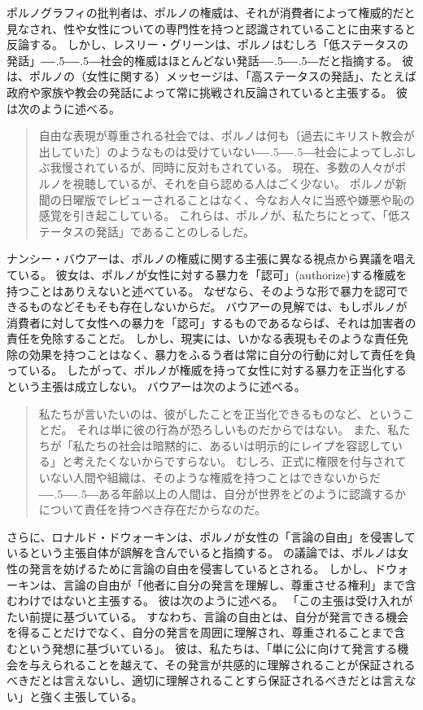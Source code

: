 \documentclass[paper=a4,book,openany]{jlreq}
\newcommand{\ig}[1]{}           %
\def\DDASH{―\kern-.5\zw―\kern-.5\zw―} %
\begin{document}
ポルノグラフィの批判者は、ポルノの権威は、それが消費者によって権威的だと見なされ、性や女性についての専門性を持つと認識されていることに由来すると反論する\citep[p.430]{langton12:_respon}。
しかし、レスリー・グリーン\ig{Leslie Green}は、ポルノはむしろ「低ステータスの発話」{\DDASH}社会的権威はほとんどない発話{\DDASH}だと指摘する。
彼は、ポルノの（女性に関する）メッセージは、「高ステータスの発話」、たとえば政府や家族や教会の発話によって常に挑戦され反論されていると主張する。
彼は次のように述べる。

\begin{quote}
自由な表現が尊重される社会では、ポルノは何も〔過去にキリスト教会が出していた〕のようなものは受けていない{\DDASH}社会によってしぶしぶ我慢されているが、同時に反対もされている。
現在、多数の人々がポルノを視聴しているが、それを自ら認める人はごく少ない。
ポルノが新聞の日曜版でレビューされることはなく、今なお人々に当惑や嫌悪や恥の感覚を引き起こしている。
これらは、ポルノが、私たちにとって、「低ステータスの発話」であることのしるしだ。
\citep[pp.296--297]{green98:_pornog_subor_silen}
\end{quote}

ナンシー・バウアーは、ポルノの権威に関する主張に異なる視点から異議を唱えている。
彼女は、ポルノが女性に対する暴力を「認可」(authorize)する権威を持つことはありえないと述べている。
なぜなら、そのような形で暴力を認可できるものなどそもそも存在しないからだ。
バウアーの見解では、もしポルノが消費者に対して女性への暴力を「認可」するものであるならば、それは加害者の責任を免除することだ。
しかし、現実には、いかなる表現もそのような責任免除の効果を持つことはなく、暴力をふるう者は常に自分の行動に対して責任を負っている。
したがって、ポルノが権威を持って女性に対する暴力を正当化するという主張は成立しない。
バウアーは次のように述べる。

\begin{quote}
私たちが言いたいのは、彼がしたことを正当化できるものなど、ということだ。
それは単に彼の行為が恐ろしいものだからではない。
また、私たちが「私たちの社会は暗黙的に、あるいは明示的にレイプを容認している」と考えたくないからですらない。
むしろ、正式に権限を付与されていない人間や組織は、そのような権威を持つことはできないからだ{\DDASH}ある年齢以上の人間は、自分が世界をどのように認識するかについて責任を持つべき存在だからなのだ。
\citep[pp.86--87]{bauer06:_how_do_thing_pornog}
\end{quote}

さらに、ロナルド・ドウォーキン\ig{Ronald Dworkin}は、ポルノが女性の「言論の自由」を侵害しているという主張自体が誤解を含んでいると指摘する。
の議論では、ポルノは女性の発言を妨げるために言論の自由を侵害しているとされる。
しかし、ドウォーキン\ig{Ronald Dworkin}は、言論の自由が「他者に自分の発言を理解し、尊重させる権利」まで含むわけではないと主張する。
彼は次のように述べる。
「この主張は受け入れがたい前提に基づいている。
すなわち、言論の自由とは、自分が発言できる機会を得ることだけでなく、自分の発言を周囲に理解され、尊重されることまで含むという発想に基づいている」。
彼は、私たちは、「単に公に向けて発言する機会を与えられることを越えて、その発言が共感的に理解されることが保証されるべきだとは言えないし、適切に理解されることすら保証されるべきだとは言えない」と強く主張している\citep[p.232]{dworkin96:_freed_law}。
\end{document}
